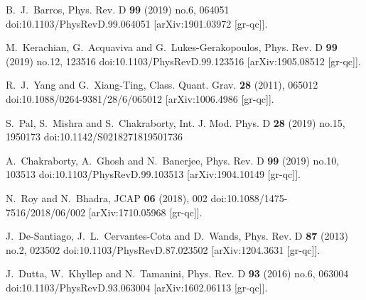 \documentclass[a4paper,12pt]{article}
\begin{document}
\begin{thebibliography}{99}
B.~J.~Barros,
Phys. Rev. D \textbf{99} (2019) no.6, 064051
doi:10.1103/PhysRevD.99.064051
[arXiv:1901.03972 [gr-qc]].
		
M.~Kerachian, G.~Acquaviva and G.~Lukes-Gerakopoulos,
Phys. Rev. D \textbf{99} (2019) no.12, 123516
doi:10.1103/PhysRevD.99.123516
[arXiv:1905.08512 [gr-qc]].
		
		
		
R.~J.~Yang and G.~Xiang-Ting,
Class. Quant. Grav. \textbf{28} (2011), 065012
doi:10.1088/0264-9381/28/6/065012
[arXiv:1006.4986 [gr-qc]].
		
		
S.~Pal, S.~Mishra and S.~Chakraborty,
Int. J. Mod. Phys. D \textbf{28} (2019) no.15, 1950173
doi:10.1142/S0218271819501736
		
		
A.~Chakraborty, A.~Ghosh and N.~Banerjee,
Phys. Rev. D \textbf{99} (2019) no.10, 103513
doi:10.1103/PhysRevD.99.103513
[arXiv:1904.10149 [gr-qc]].
		
N.~Roy and N.~Bhadra,
JCAP \textbf{06} (2018), 002
doi:10.1088/1475-7516/2018/06/002
[arXiv:1710.05968 [gr-qc]].
		
		
J.~De-Santiago, J.~L.~Cervantes-Cota and D.~Wands,
Phys. Rev. D \textbf{87} (2013) no.2, 023502
doi:10.1103/PhysRevD.87.023502
[arXiv:1204.3631 [gr-qc]].
		
J.~Dutta, W.~Khyllep and N.~Tamanini,
Phys. Rev. D \textbf{93} (2016) no.6, 063004
doi:10.1103/PhysRevD.93.063004
[arXiv:1602.06113 [gr-qc]].
		

\end{thebibliography}
\end{document}
